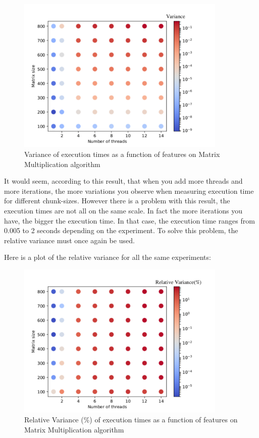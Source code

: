 \begin{figure}[H]
	\centering
	\includegraphics[width=100mm]{images/var_chunk_sizes.pdf}
	\caption{Variance of execution times as a function of features on Matrix Multiplication algorithm}
\end{figure}

 It would seem, according to this result, that when you add more threads and more iterations, the more variations you observe when measuring execution time for different chunk-sizes. However there is a problem with this result, the execution times are not all on the same scale. In fact the more iterations you have, the bigger the execution time. In that case, the execution time ranges from 0.005 to 2 seconds depending on the experiment. To solve this problem, the relative variance must once again be used. 

Here is a plot of the relative variance for all the same experiments:

\begin{figure}[H]
	\centering
	\includegraphics[width=100mm]{images/rel_var_chunk_sizes.pdf}
	\caption{Relative Variance (\%) of execution times as a function of features on Matrix Multiplication algorithm}
\end{figure}

